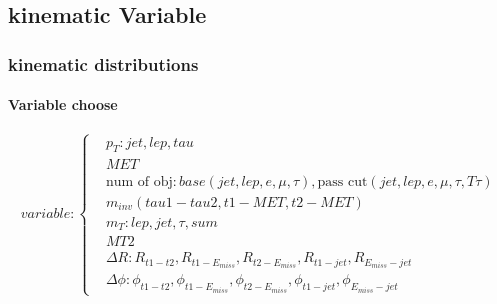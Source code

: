 \documentclass[usenames,dvipsnames]{beamer}
\begin{document}
\subsection{kinematic Variable}
\begin{frame}
	\frametitle{kinematic distributions}
	\framesubtitle{Variable choose}
		\begin{equation*}
		variable:
		\left\{
		\begin{split}
			& p_T:jet,lep,tau\\
      & MET\\
			& \text{num of obj}:base(jet,lep,e,\mu,\tau),\text{pass cut}(jet,lep,e,\mu,\tau,T\tau)\\
			& m_{inv}(tau1-tau2,t1-MET,t2-MET)\\
			& m_T:lep,jet,\tau,sum\\
			& MT2\\
			& \Delta R: R_{t1-t2},R_{t1-E_{miss}},R_{t2-E_{miss}}, R_{t1-jet},R_{E_{miss}-jet}\\
			& \Delta \phi:\phi_{t1-t2},\phi_{t1-E_{miss}},\phi_{t2-E_{miss}}, \phi_{t1-jet},\phi_{E_{miss}-jet}
		\end{split}
		\right.
		\end{equation*}
\end{frame}
\end{document}

